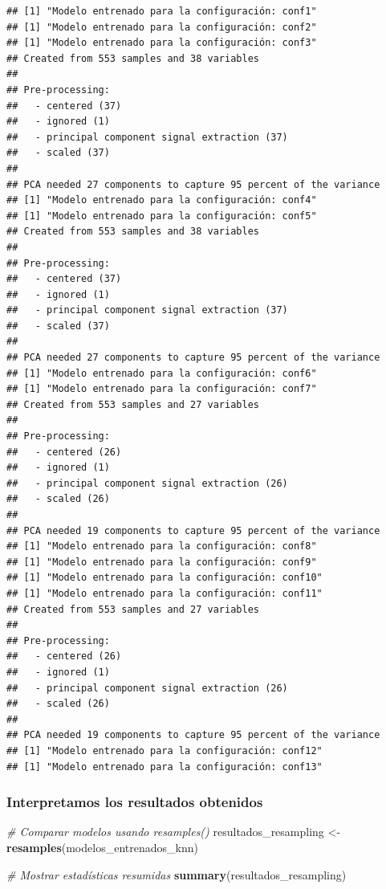 \documentclass[
]{article}
\newenvironment{Shaded}{\begin{snugshade}}{\end{snugshade}}
\newcommand{\CommentTok}[1]{\textcolor[rgb]{0.56,0.35,0.01}{\textit{#1}}}
\newcommand{\FunctionTok}[1]{\textcolor[rgb]{0.13,0.29,0.53}{\textbf{#1}}}
\newcommand{\NormalTok}[1]{#1}
\newcommand{\OtherTok}[1]{\textcolor[rgb]{0.56,0.35,0.01}{#1}}
\begin{document}
\begin{verbatim}
## [1] "Modelo entrenado para la configuración: conf1"
## [1] "Modelo entrenado para la configuración: conf2"
## [1] "Modelo entrenado para la configuración: conf3"
## Created from 553 samples and 38 variables
## 
## Pre-processing:
##   - centered (37)
##   - ignored (1)
##   - principal component signal extraction (37)
##   - scaled (37)
## 
## PCA needed 27 components to capture 95 percent of the variance
## [1] "Modelo entrenado para la configuración: conf4"
## [1] "Modelo entrenado para la configuración: conf5"
## Created from 553 samples and 38 variables
## 
## Pre-processing:
##   - centered (37)
##   - ignored (1)
##   - principal component signal extraction (37)
##   - scaled (37)
## 
## PCA needed 27 components to capture 95 percent of the variance
## [1] "Modelo entrenado para la configuración: conf6"
## [1] "Modelo entrenado para la configuración: conf7"
## Created from 553 samples and 27 variables
## 
## Pre-processing:
##   - centered (26)
##   - ignored (1)
##   - principal component signal extraction (26)
##   - scaled (26)
## 
## PCA needed 19 components to capture 95 percent of the variance
## [1] "Modelo entrenado para la configuración: conf8"
## [1] "Modelo entrenado para la configuración: conf9"
## [1] "Modelo entrenado para la configuración: conf10"
## [1] "Modelo entrenado para la configuración: conf11"
## Created from 553 samples and 27 variables
## 
## Pre-processing:
##   - centered (26)
##   - ignored (1)
##   - principal component signal extraction (26)
##   - scaled (26)
## 
## PCA needed 19 components to capture 95 percent of the variance
## [1] "Modelo entrenado para la configuración: conf12"
## [1] "Modelo entrenado para la configuración: conf13"
\end{verbatim}

\hypertarget{interpretamos-los-resultados-obtenidos-2}{%
\subsubsection{Interpretamos los resultados
obtenidos}\label{interpretamos-los-resultados-obtenidos-2}}

\begin{Shaded}
\begin{Highlighting}[]
\CommentTok{\# Comparar modelos usando resamples()}
\NormalTok{resultados\_resampling }\OtherTok{\textless{}{-}} \FunctionTok{resamples}\NormalTok{(modelos\_entrenados\_knn)}

\CommentTok{\# Mostrar estadísticas resumidas}
\FunctionTok{summary}\NormalTok{(resultados\_resampling)}
\end{Highlighting}
\end{Shaded}
\end{document}
